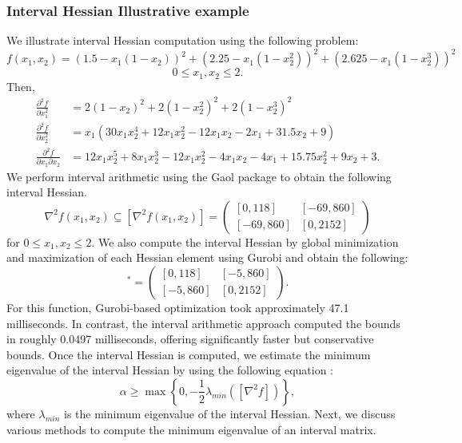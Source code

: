 \documentclass{elsarticle}
\numberwithin{equation}{section}
\begin{document}
\subsubsection{Interval Hessian Illustrative example}
We illustrate interval Hessian computation using the following problem:
\begin{equation}
    f({x}_1,{x}_2) = \left(1.5 - {x}_1(1 - {x}_2)\right)^2 + \left(2.25 - {x}_1(1 - {x}_2^2)\right)^2 + \left(2.625 - {x}_1(1 - {x}_2^3)\right)^2    
    \label{eqn:example}
\end{equation}
\[
0 \leq {x}_1, {x}_2 \leq 2.
\]
Then,
\[
\begin{aligned}
\frac{\partial^2 f}{\partial {x}_1^2} &= 2(1 - {x}_2)^2 + 2(1 - {x}_2^2)^2 + 2(1 - {x}_2^3)^2 \\
\frac{\partial^2 f}{\partial {x}_2^2} &= {x}_1\left(30{x}_1 {x}_2^4 + 12{x}_1 {x}_2^2 - 12{x}_1 {x}_2 - 2{x}_1 + 31.5{x}_2 + 9\right) \\
\frac{\partial^2 f}{\partial {x}_1 \partial {x}_2} &= 12{x}_1 {x}_2^5 + 8{x}_1 {x}_2^3 - 12{x}_1 {x}_2^2 - 4{x}_1 {x}_2 - 4{x}_1 + 15.75{x}_2^2 + 9{x}_2 + 3.
\end{aligned}
\]
We perform interval arithmetic using the Gaol package \cite{goualard2005gaol} to obtain the following interval Hessian.
\begin{equation}
    \nabla^2 f({x}_1,{x}_2) \subseteq [\nabla^2f({x}_1,{x}_2)] = \begin{pmatrix}
    [0, 118] & [-69, 860] \\
    [-69, 860] & [0, 2152]
    \end{pmatrix}
    \label{eq:exampleIntHess}
\end{equation}
for $0 \leq {x}_1, {x}_2 \leq 2$. We also compute the interval Hessian by global minimization and maximization of each Hessian element using Gurobi and obtain the following: 
\begin{equation}
    [\nabla^2f({x}_1,{x}_2)]^* = \begin{pmatrix}
    [0, 118] & [-5, 860] \\
    [-5, 860] & [0, 2152]   
    \end{pmatrix}.
    \label{eq:exactIntHess}
\end{equation}
For this function, Gurobi-based optimization took approximately 47.1 milliseconds. In contrast, the interval arithmetic approach computed the bounds in roughly 0.0497 milliseconds, offering significantly faster but conservative bounds. Once the interval Hessian is computed, we estimate the minimum eigenvalue of the interval Hessian by using the following equation \cite{androulakis1995alphabb}: 
\begin{equation}
    \alpha \geq \max\left\{{0, -\frac{1}{2}\lambda_{min}([\nabla^2 f])}\right\},
    \label{eq:alpha1}
\end{equation}
where $\lambda_{min}$ is the minimum eigenvalue of the interval Hessian. Next, we discuss various methods to compute the minimum eigenvalue of an interval matrix. 
\end{document}

